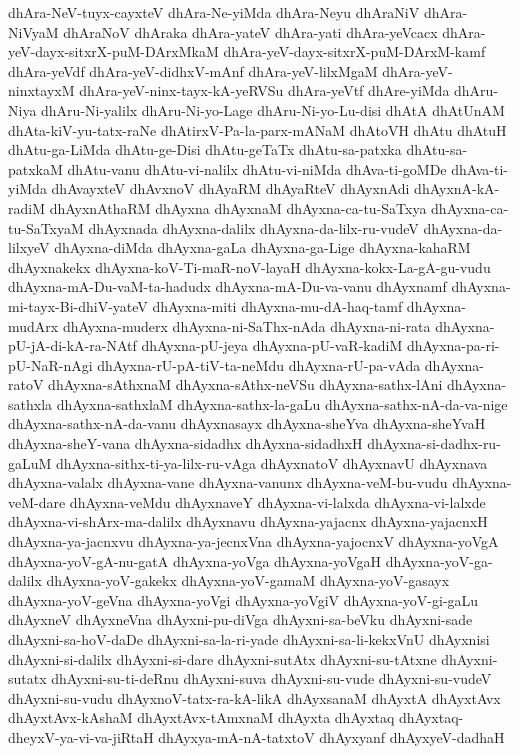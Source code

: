 {dhAra-NeV-tuyx-cayxteV
dhAra-Ne-yiMda
dhAra-Neyu
dhAraNiV
dhAra-NiVyaM
dhAraNoV
dhAraka
dhAra-yateV
dhAra-yati
dhAra-yeVcacx
dhAra-yeV-dayx-sitxrX-puM-DArxMkaM
dhAra-yeV-dayx-sitxrX-puM-DArxM-kamf
dhAra-yeVdf
dhAra-yeV-didhxV-mAnf
dhAra-yeV-lilxMgaM
dhAra-yeV-ninxtayxM
dhAra-yeV-ninx-tayx-kA-yeRVSu
dhAra-yeVtf
dhAre-yiMda
dhAru-Niya
dhAru-Ni-yalilx
dhAru-Ni-yo-Lage
dhAru-Ni-yo-Lu-disi
dhAtA
dhAtUnAM
dhAta-kiV-yu-tatx-raNe
dhAtirxV-Pa-la-parx-mANaM
dhAtoVH
dhAtu
dhAtuH
dhAtu-ga-LiMda
dhAtu-ge-Disi
dhAtu-geTaTx
dhAtu-sa-patxka
dhAtu-sa-patxkaM
dhAtu-vanu
dhAtu-vi-nalilx
dhAtu-vi-niMda
dhAva-ti-goMDe
dhAva-ti-yiMda
dhAvayxteV
dhAvxnoV
dhAyaRM
dhAyaRteV
dhAyxnAdi
dhAyxnA-kA-radiM
dhAyxnAthaRM
dhAyxna
dhAyxnaM
dhAyxna-ca-tu-SaTxya
dhAyxna-ca-tu-SaTxyaM
dhAyxnada
dhAyxna-dalilx
dhAyxna-da-lilx-ru-vudeV
dhAyxna-da-lilxyeV
dhAyxna-diMda
dhAyxna-gaLa
dhAyxna-ga-Lige
dhAyxna-kahaRM
dhAyxnakekx
dhAyxna-koV-Ti-maR-noV-layaH
dhAyxna-kokx-La-gA-gu-vudu
dhAyxna-mA-Du-vaM-ta-hadudx
dhAyxna-mA-Du-va-vanu
dhAyxnamf
dhAyxna-mi-tayx-Bi-dhiV-yateV
dhAyxna-miti
dhAyxna-mu-dA-haq-tamf
dhAyxna-mudArx
dhAyxna-muderx
dhAyxna-ni-SaThx-nAda
dhAyxna-ni-rata
dhAyxna-pU-jA-di-kA-ra-NAtf
dhAyxna-pU-jeya
dhAyxna-pU-vaR-kadiM
dhAyxna-pa-ri-pU-NaR-nAgi
dhAyxna-rU-pA-tiV-ta-neMdu
dhAyxna-rU-pa-vAda
dhAyxna-ratoV
dhAyxna-sAthxnaM
dhAyxna-sAthx-neVSu
dhAyxna-sathx-lAni
dhAyxna-sathxla
dhAyxna-sathxlaM
dhAyxna-sathx-la-gaLu
dhAyxna-sathx-nA-da-va-nige
dhAyxna-sathx-nA-da-vanu
dhAyxnasayx
dhAyxna-sheYva
dhAyxna-sheYvaH
dhAyxna-sheY-vana
dhAyxna-sidadhx
dhAyxna-sidadhxH
dhAyxna-si-dadhx-ru-gaLuM
dhAyxna-sithx-ti-ya-lilx-ru-vAga
dhAyxnatoV
dhAyxnavU
dhAyxnava
dhAyxna-valalx
dhAyxna-vane
dhAyxna-vanunx
dhAyxna-veM-bu-vudu
dhAyxna-veM-dare
dhAyxna-veMdu
dhAyxnaveY
dhAyxna-vi-lalxda
dhAyxna-vi-lalxde
dhAyxna-vi-shArx-ma-dalilx
dhAyxnavu
dhAyxna-yajacnx
dhAyxna-yajacnxH
dhAyxna-ya-jacnxvu
dhAyxna-ya-jecnxVna
dhAyxna-yajocnxV
dhAyxna-yoVgA
dhAyxna-yoV-gA-nu-gatA
dhAyxna-yoVga
dhAyxna-yoVgaH
dhAyxna-yoV-ga-dalilx
dhAyxna-yoV-gakekx
dhAyxna-yoV-gamaM
dhAyxna-yoV-gasayx
dhAyxna-yoV-geVna
dhAyxna-yoVgi
dhAyxna-yoVgiV
dhAyxna-yoV-gi-gaLu
dhAyxneV
dhAyxneVna
dhAyxni-pu-diVga
dhAyxni-sa-beVku
dhAyxni-sade
dhAyxni-sa-hoV-daDe
dhAyxni-sa-la-ri-yade
dhAyxni-sa-li-kekxVnU
dhAyxnisi
dhAyxni-si-dalilx
dhAyxni-si-dare
dhAyxni-sutAtx
dhAyxni-su-tAtxne
dhAyxni-sutatx
dhAyxni-su-ti-deRnu
dhAyxni-suva
dhAyxni-su-vude
dhAyxni-su-vudeV
dhAyxni-su-vudu
dhAyxnoV-tatx-ra-kA-likA
dhAyxsanaM
dhAyxtA
dhAyxtAvx
dhAyxtAvx-kAshaM
dhAyxtAvx-tAmxnaM
dhAyxta
dhAyxtaq
dhAyxtaq-dheyxV-ya-vi-va-jiRtaH
dhAyxya-mA-nA-tatxtoV
dhAyxyanf
dhAyxyeV-dadhaH
}
